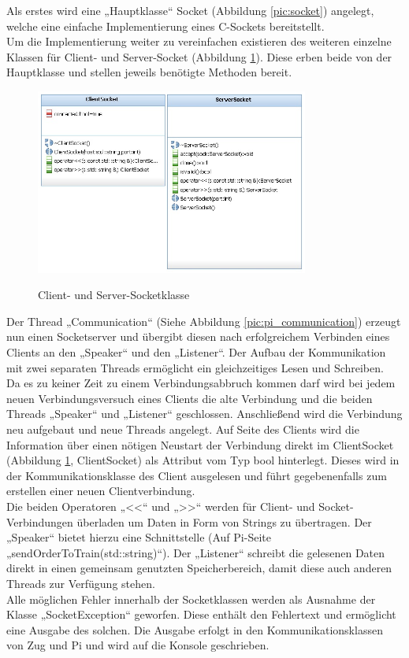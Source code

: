 Als erstes wird eine „Hauptklasse“ Socket (Abbildung \ref{pic:socket}) angelegt, welche eine einfache Implementierung eines C-Sockets bereitstellt.\\
Um die Implementierung weiter zu vereinfachen existieren des weiteren einzelne Klassen für Client- und Server-Socket (Abbildung \ref{pic:server_client}). Diese erben beide von der Hauptklasse und stellen jeweils benötigte Methoden bereit. \\
\begin{figure}
	\caption{Client- und Server-Socketklasse}
	\includegraphics[width=0.8\textwidth]{content/pictures/socket/server_client_socket.jpg}
	\label{pic:server_client}
\end{figure}
Der Thread „Communication“ (Siehe Abbildung \ref{pic:pi_communication}) erzeugt nun einen Socketserver und übergibt diesen nach erfolgreichem Verbinden eines Clients an den „Speaker“ und den „Listener“. Der Aufbau der Kommunikation mit zwei separaten Threads ermöglicht ein gleichzeitiges Lesen und Schreiben.\\
Da es zu keiner Zeit zu einem Verbindungsabbruch kommen darf wird bei jedem neuen Verbindungsversuch eines Clients die alte Verbindung und die beiden Threads „Speaker“ und „Listener“ geschlossen. Anschließend wird die Verbindung neu aufgebaut und neue Threads angelegt. Auf Seite des Clients wird die Information über einen nötigen Neustart der Verbindung direkt im ClientSocket (Abbildung \ref{pic:server_client}, ClientSocket) als Attribut vom Typ bool hinterlegt. Dieses wird in der Kommunikationsklasse des Client ausgelesen und führt gegebenenfalls zum erstellen einer neuen Clientverbindung.\\
Die beiden Operatoren  „<<“ und „>>“ werden für Client- und Socket-Verbindungen überladen um Daten in Form von Strings zu übertragen. Der „Speaker“ bietet hierzu eine Schnittstelle (Auf Pi-Seite „sendOrderToTrain(std::string)“). Der „Listener“ schreibt die gelesenen Daten direkt in einen gemeinsam genutzten Speicherbereich, damit diese auch anderen Threads zur Verfügung stehen.\\
Alle möglichen Fehler innerhalb der Socketklassen werden als Ausnahme der Klasse „SocketException“ geworfen. Diese enthält den Fehlertext und ermöglicht eine Ausgabe des solchen. Die Ausgabe erfolgt in den Kommunikationsklassen von Zug und Pi und wird auf die Konsole geschrieben.

